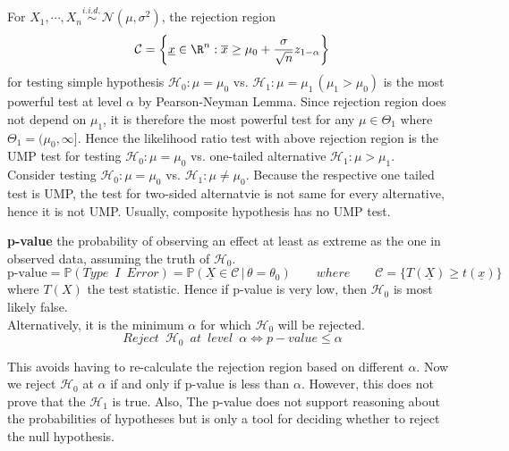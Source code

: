 \documentclass[11pt]{article}
\begin{document}
\begin{example}
  For $X_1, \cdots, X_n \stackrel{i.i.d,}{\sim} \mathcal{N}(\mu, \sigma^2)$, the rejection region
  \[
    \mathcal{C} = \left\{ \underline{x}\in\R^n: \overline{x} \geq \mu_0 + \frac{\sigma}{\sqrt{n}}z_{1-\alpha} \right\}
  \]
  for testing simple hypothesis $\mathcal{H}_0: \mu = \mu_0$ vs. $\mathcal{H}_1: \mu = \mu_1 \,(\mu_1 > \mu_0)$ is the most powerful test at level $\alpha$ by Pearson-Neyman Lemma. Since rejection region does not depend on $\mu_1$, it is therefore the most powerful test for any $\mu \in\Theta_1$ where $\Theta_1 = (\mu_0, \infty]$. Hence the likelihood ratio test with above rejection region is the UMP test for testing $\mathcal{H}_0: \mu = \mu_0$ vs. one-tailed alternative $\mathcal{H}_1: \mu > \mu_1$.\\
  Consider testing $\mathcal{H}_0: \mu = \mu_0$ vs. $\mathcal{H}_1: \mu \neq \mu_0$. Because the respective one tailed test is UMP, the test for two-sided alternatvie is not same for every alternative, hence it is not UMP. Usually, composite hypothesis has no UMP test.
\end{example}

\begin{defn*}
  \textbf{p-value} the probability of observing an effect at least as extreme as the one in observed data, assuming the truth of $\mathcal{H}_0$.
  \[
    \text{p-value} = \mathbb{P}(Type\enspace I\enspace Error) = \mathbb{P}(\underline{X}\in \mathcal{C}\,|\, \theta = \theta_0) \quad \quad where \quad \quad \mathcal{C} = \{ T(\underline{X}) \geq t(\underline{x})\}
  \]
  where $T(X)$ the test statistic. Hence if p-value is very low, then $\mathcal{H}_0$ is most likely false. \\
  Alternatively, it is the minimum $\alpha$ for which $\mathcal{H}_0$ will be rejected.
  \[
    Reject\enspace \mathcal{H}_0 \enspace at\enspace level\enspace \alpha \iff p-value \leq \alpha
  \]
  \begin{rem}
    This avoids having to re-calculate the rejection region based on different $\alpha$. Now we reject $\mathcal{H}_0$ at $\alpha$ if and only if p-value is less than $\alpha$. However, this does not prove that the $\mathcal{H}_1$ is true. Also, The p-value does not support reasoning about the probabilities of hypotheses but is only a tool for deciding whether to reject the null hypothesis.
  \end{rem}
\end{defn*}
\end{document}

